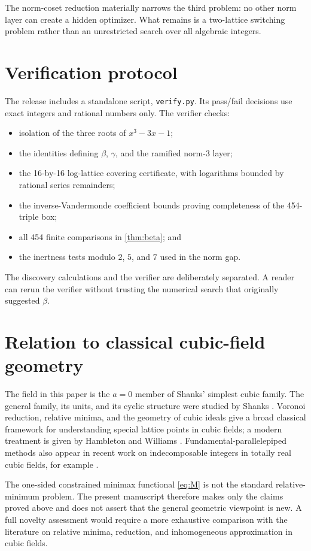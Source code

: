 \documentclass[11pt]{article}
\theoremstyle{definition}
\begin{document}
The norm-coset reduction materially narrows the third problem: no other norm layer can create a hidden optimizer.  What remains is a two-lattice switching problem rather than an unrestricted search over all algebraic integers.

\section{Verification protocol}
The release includes a standalone script, \texttt{verify.py}.  Its pass/fail decisions use exact integers and rational numbers only.  The verifier checks:
\begin{itemize}
\item isolation of the three roots of $x^3-3x-1$;
\item the identities defining $\beta$, $\gamma$, and the ramified norm-$3$ layer;
\item the 16-by-16 log-lattice covering certificate, with logarithms bounded by rational series remainders;
\item the inverse-Vandermonde coefficient bounds proving completeness of the 454-triple box;
\item all 454 finite comparisons in \cref{thm:beta}; and
\item the inertness tests modulo $2$, $5$, and $7$ used in the norm gap.
\end{itemize}
The discovery calculations and the verifier are deliberately separated.  A reader can rerun the verifier without trusting the numerical search that originally suggested $\beta$.

\section{Relation to classical cubic-field geometry}
The field in this paper is the $a=0$ member of Shanks' simplest cubic family.  The general family, its units, and its cyclic structure were studied by Shanks \cite{Shanks1974}.  Voronoi reduction, relative minima, and the geometry of cubic ideals give a broad classical framework for understanding special lattice points in cubic fields; a modern treatment is given by Hambleton and Williams \cite{HW2018}.  Fundamental-parallelepiped methods also appear in recent work on indecomposable integers in totally real cubic fields, for example \cite{KalaSgallovaTinkova2025,Tinkova2023}.

The one-sided constrained minimax functional \eqref{eq:M} is not the standard relative-minimum problem.  The present manuscript therefore makes only the claims proved above and does not assert that the general geometric viewpoint is new.  A full novelty assessment would require a more exhaustive comparison with the literature on relative minima, reduction, and inhomogeneous approximation in cubic fields.
\end{document}
